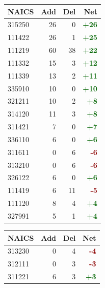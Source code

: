 \documentclass[11pt]{article}
\begin{document}
\begin{table}[H]
\centering
\begin{minipage}{0.48\textwidth}
\centering
{}
\begin{tabular}{lrrr}
\toprule
\textbf{NAICS} & \textbf{Add} & \textbf{Del} & \textbf{Net} \\
\midrule
315250 & 26 & 0 & \textcolor{darkgreen}{\textbf{+26}} \\
111422 & 26 & 1 & \textcolor{darkgreen}{\textbf{+25}} \\
111219 & 60 & 38 & \textcolor{darkgreen}{\textbf{+22}} \\
111332 & 15 & 3 & \textcolor{darkgreen}{\textbf{+12}} \\
111339 & 13 & 2 & \textcolor{darkgreen}{\textbf{+11}} \\
335910 & 10 & 0 & \textcolor{darkgreen}{\textbf{+10}} \\
321211 & 10 & 2 & \textcolor{darkgreen}{\textbf{+8}} \\
314120 & 11 & 3 & \textcolor{darkgreen}{\textbf{+8}} \\
311421 & 7 & 0 & \textcolor{darkgreen}{\textbf{+7}} \\
336110 & 6 & 0 & \textcolor{darkgreen}{\textbf{+6}} \\
311611 & 0 & 6 & \textcolor{darkred}{\textbf{-6}} \\
313210 & 0 & 6 & \textcolor{darkred}{\textbf{-6}} \\
326122 & 6 & 0 & \textcolor{darkgreen}{\textbf{+6}} \\
111419 & 6 & 11 & \textcolor{darkred}{\textbf{-5}} \\
111120 & 8 & 4 & \textcolor{darkgreen}{\textbf{+4}} \\
327991 & 5 & 1 & \textcolor{darkgreen}{\textbf{+4}} \\
\bottomrule
\end{tabular}
\end{minipage}
\hfill
\begin{minipage}{0.48\textwidth}
\centering
{}
\begin{tabular}{lrrr}
\toprule
\textbf{NAICS} & \textbf{Add} & \textbf{Del} & \textbf{Net} \\
\midrule
313230 & 0 & 4 & \textcolor{darkred}{\textbf{-4}} \\
312111 & 0 & 3 & \textcolor{darkred}{\textbf{-3}} \\
311221 & 6 & 3 & \textcolor{darkgreen}{\textbf{+3}} \\

\end{tabular}
\end{minipage}
\end{table}
\end{document}
